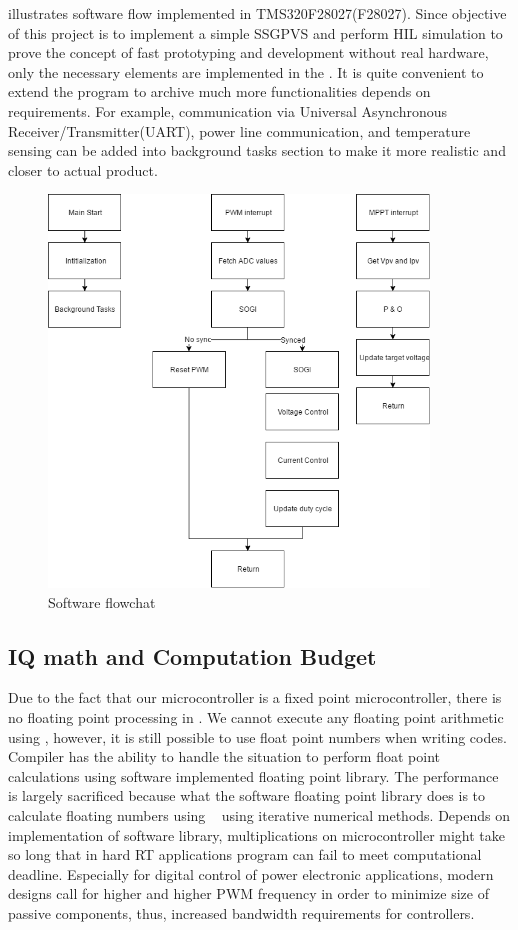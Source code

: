  illustrates software flow implemented in TMS320F28027(F28027). Since objective of this project is to implement a simple \gls{SSGPVS} and perform \gls{HIL} simulation to prove the concept of fast prototyping and development without real hardware, only the necessary elements are implemented in the \tms. It is quite convenient to extend the program to archive much more functionalities depends on requirements. For example, communication via  Universal Asynchronous Receiver/Transmitter(UART), power line communication, and temperature sensing can be added into background tasks section to make it more realistic and closer to actual product. 
\begin{figure}[h]
     \centering
     \includegraphics[width = 0.9\textwidth]{figures/software_flow}
     \caption{Software flowchat}
     \label{fig:software_flow}
\end{figure}
\subsection{IQ math and Computation Budget}
Due to the fact that our microcontroller is a fixed point microcontroller, there is no floating point processing in \tms. We cannot execute any floating point arithmetic using \tms, however, it is still possible to use float point numbers when writing codes. Compiler has the ability to handle the situation to perform float point calculations using software implemented floating point library. The performance is largely sacrificed because what the software floating point library does is to calculate floating numbers using \fp~ using iterative numerical methods. Depends on implementation of software library, multiplications on microcontroller might take so long that in hard \gls{RT} applications program can fail to meet computational deadline. Especially for digital control of power electronic applications, modern designs call for higher and higher \gls{PWM} frequency in order to minimize size of passive components, thus, increased bandwidth requirements for controllers. 

